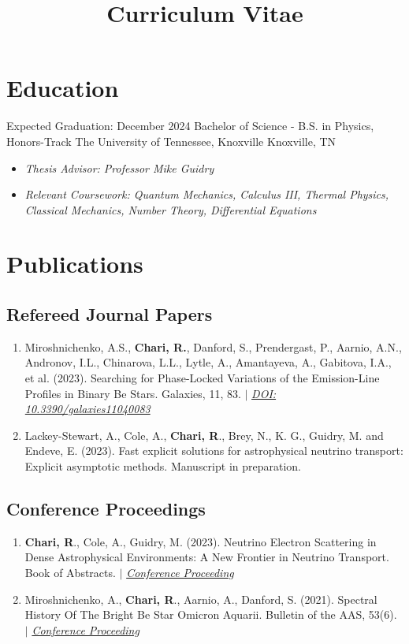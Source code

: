 \documentclass[10pt,a4paper,sans]{moderncv}
\title{Curriculum Vitae}
\begin{document}
\makecvtitle



\section{Education}

\cventry
{Expected Graduation: December 2024}
{Bachelor of Science - B.S. in Physics, Honors-Track} 
{The University of Tennessee, Knoxville}
{Knoxville, TN}
{}
{
\begin{itemize}
\item \textit{Thesis Advisor: Professor Mike Guidry}
\item \textit{Relevant Coursework: Quantum Mechanics, Calculus III, Thermal Physics, Classical Mechanics, Number Theory, Differential Equations}
\end{itemize}
}


\section{Publications}

\subsection{Refereed Journal Papers}
\begin{enumerate}
\item Miroshnichenko, A.S., \textbf{Chari, R.}, Danford, S., Prendergast, P., Aarnio, A.N., Andronov, I.L., Chinarova, L.L., Lytle, A., Amantayeva, A., Gabitova, I.A., et al. (2023). Searching for Phase-Locked Variations of the Emission-Line Profiles in Binary Be Stars. Galaxies, 11, 83. $|$ \emph{\href{https://doi.org/10.3390/galaxies11040083}{\color{blue}DOI: 10.3390/galaxies11040083}}

\item Lackey-Stewart, A., Cole, A., \textbf{Chari, R}., Brey, N., K. G., Guidry, M. and Endeve, E. (2023). Fast explicit solutions for astrophysical neutrino transport: Explicit asymptotic methods. Manuscript in preparation.
\end{enumerate}

\subsection{Conference Proceedings}
\begin{enumerate}
\item \textbf{Chari, R}., Cole, A., Guidry, M. (2023). Neutrino Electron Scattering in Dense Astrophysical Environments: A New Frontier in Neutrino Transport. Book of Abstracts. $|$ \emph{\href{https://indico.frib.msu.edu/event/58/contributions/1518/}{\color{blue}Conference Proceeding}}

\item Miroshnichenko, A., \textbf{Chari, R}., Aarnio, A., Danford, S. (2021). Spectral History Of The Bright Be Star Omicron Aquarii. Bulletin of the AAS, 53(6). $|$ \emph{\href{https://ui.adsabs.harvard.edu/abs/2021AAS...23831606M/abstract}{\color{blue}Conference Proceeding}}
\end{enumerate}
\end{document}
